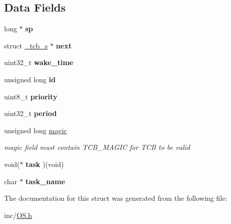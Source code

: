 \subsection*{Data Fields}
\begin{DoxyCompactItemize}
\item 
long $\ast$ {\bfseries sp}\hypertarget{struct__tcb__s_a13f117347df648dbca66e6cbb97a4e0f}{}\label{struct__tcb__s_a13f117347df648dbca66e6cbb97a4e0f}

\item 
struct \hyperlink{struct__tcb__s}{\+\_\+tcb\+\_\+s} $\ast$ {\bfseries next}\hypertarget{struct__tcb__s_af53c260a7b65e7244f809cda9ebb835f}{}\label{struct__tcb__s_af53c260a7b65e7244f809cda9ebb835f}

\item 
uint32\+\_\+t {\bfseries wake\+\_\+time}\hypertarget{struct__tcb__s_a442099ddd859c3f33981828aeef085fe}{}\label{struct__tcb__s_a442099ddd859c3f33981828aeef085fe}

\item 
unsigned long {\bfseries id}\hypertarget{struct__tcb__s_a48e677e5c96cf412d20854802271b9b4}{}\label{struct__tcb__s_a48e677e5c96cf412d20854802271b9b4}

\item 
uint8\+\_\+t {\bfseries priority}\hypertarget{struct__tcb__s_a319151d52db9a3fb0b3c018bce9fcb4a}{}\label{struct__tcb__s_a319151d52db9a3fb0b3c018bce9fcb4a}

\item 
uint32\+\_\+t {\bfseries period}\hypertarget{struct__tcb__s_a85c4e73f3d5ccebf43c628d9e1fc4e4f}{}\label{struct__tcb__s_a85c4e73f3d5ccebf43c628d9e1fc4e4f}

\item 
unsigned long \hyperlink{struct__tcb__s_a1f71cc7a8b23ee420548662caced5301}{magic}\hypertarget{struct__tcb__s_a1f71cc7a8b23ee420548662caced5301}{}\label{struct__tcb__s_a1f71cc7a8b23ee420548662caced5301}

\begin{DoxyCompactList}\small\item\em magic field must contain T\+C\+B\+\_\+\+M\+A\+G\+IC for T\+CB to be valid \end{DoxyCompactList}\item 
void($\ast$ {\bfseries task} )(void)\hypertarget{struct__tcb__s_af815dde5661c4092abe9838fb28d9ed2}{}\label{struct__tcb__s_af815dde5661c4092abe9838fb28d9ed2}

\item 
char $\ast$ {\bfseries task\+\_\+name}\hypertarget{struct__tcb__s_a66241e192445da72f98da4e2d1359d5a}{}\label{struct__tcb__s_a66241e192445da72f98da4e2d1359d5a}

\end{DoxyCompactItemize}


The documentation for this struct was generated from the following file\+:\begin{DoxyCompactItemize}
\item 
inc/\hyperlink{OS_8h}{O\+S.\+h}\end{DoxyCompactItemize}
